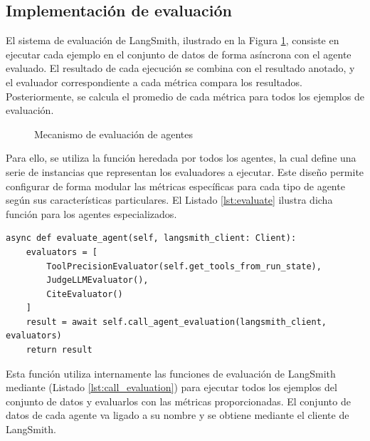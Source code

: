 \subsection{Implementación de evaluación}
\label{sec:langsmith}
El sistema de evaluación de LangSmith, ilustrado en la Figura \ref{fig:mem_1}, consiste en ejecutar cada ejemplo en el conjunto de datos de forma asíncrona con el agente evaluado. El resultado de cada ejecución se combina con el resultado anotado, y el evaluador correspondiente a cada métrica compara los resultados. Posteriormente, se calcula el promedio de cada métrica para todos los ejemplos de evaluación.

\begin{figure}[h]
\centering
{}
\caption{Mecanismo de evaluación de agentes}
\label{fig:mem_1}
\end{figure}

Para ello, se utiliza la función  heredada por todos los agentes, la cual define una serie de instancias  que representan los evaluadores a ejecutar. Este diseño permite configurar de forma modular las métricas específicas para cada tipo de agente según sus características particulares. El Listado \ref{lst:evaluate} ilustra dicha función para los agentes especializados.

\begin{lstlisting}[caption={Evaluación de agentes especializados},label={lst:evaluate}]
async def evaluate_agent(self, langsmith_client: Client):
    evaluators = [
        ToolPrecisionEvaluator(self.get_tools_from_run_state),
        JudgeLLMEvaluator(),
        CiteEvaluator()
    ]
    result = await self.call_agent_evaluation(langsmith_client, evaluators)
    return result
\end{lstlisting}

Esta función utiliza internamente las funciones de evaluación de LangSmith mediante  (Listado \ref{lst:call_evaluation}) para ejecutar todos los ejemplos del conjunto de datos y evaluarlos con las métricas proporcionadas. El conjunto de datos de cada agente va ligado a su nombre y se obtiene mediante el cliente de LangSmith.

